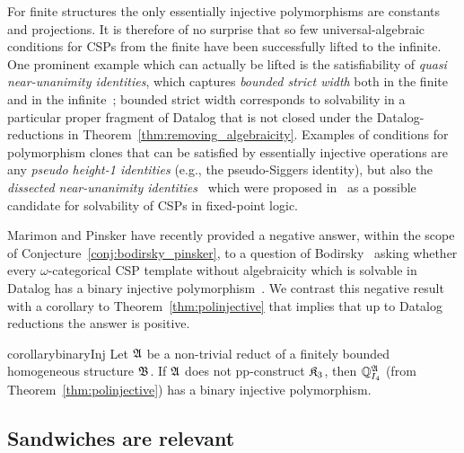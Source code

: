  For finite structures the only essentially injective polymorphisms are constants and projections.
%
It is therefore of no surprise that so few universal-algebraic conditions for CSPs from the finite have been successfully lifted to the infinite. 
%   
One prominent example which can actually be lifted is the satisfiability of \emph{quasi near-unanimity identities}, which captures \emph{bounded strict width} both in the finite and in the infinite~\cite{bodirsky2013datalog}; bounded strict width corresponds to solvability in a particular proper fragment of Datalog that is not closed under the Datalog-reductions in Theorem~\ref{thm:removing_algebraicity}.
%  
Examples of conditions for polymorphism clones that can be satisfied by essentially injective operations  
are any \emph{pseudo height-1 identities} %
(e.g., the pseudo-Siggers identity), but also the \emph{dissected near-unanimity identities}~\cite{gillibert2022symmetries} which were proposed in~\cite{bodirsky2022descriptive} as a possible candidate for solvability of CSPs in fixed-point logic. 

 
Marimon and Pinsker have recently provided a negative answer, within the scope of  Conjecture~\ref{conj:bodirsky_pinsker}, to a question of Bodirsky~\cite[Question 14.2.6(27)]{bodirsky2021complexity} asking whether every $\omega$-categorical CSP template without algebraicity which is  solvable in Datalog has a binary injective polymorphism~\cite[Corollary~8.10]{MarimonPinsker23}.  We contrast this negative result with a corollary to Theorem~\ref{thm:polinjective} that implies that up to Datalog reductions the answer is positive.
 
\begin{restatable}{corollary}{binaryInj}\label{cor:binaryInj} 
  Let $\mathfrak{A}$ be a non-trivial reduct of a finitely bounded homogeneous structure $\mathfrak{B}$. If $\mathfrak{A}$ does not pp-construct $\mathfrak{K}_3$, then $\mathbb{Q}^{\mathfrak{A}}_{I_4}$ (from Theorem~\ref{thm:polinjective}) has a binary injective polymorphism.  
\end{restatable}

\subsection{Sandwiches are relevant}

